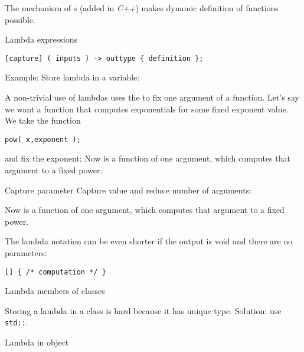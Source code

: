 
The mechanism of s (added in
\emph{C++}) makes
dynamic definition of functions possible.

\begin{block}{Lambda expressions}
  \label{sl:lambda-syntax}
\begin{verbatim}
[capture] ( inputs ) -> outtype { definition };
\end{verbatim}
Example:
Store lambda in a variable:
\end{block}

A non-trivial use of lambdas uses the  to fix one argument of a
function.
Let's say we want a function that computes exponentials for some fixed
exponent value. We take the 
 function
\begin{verbatim}
pow( x,exponent );
\end{verbatim}
and fix the exponent:
%
%
Now  is a function of one argument, which computes
that argument to a fixed power.

\begin{slide}{Capture parameter}
  \label{sl:lambda-capture}
  Capture value and reduce number of arguments:

  Now  is a function of one argument, which computes
  that argument to a fixed power.
\end{slide}

The lambda notation can be even shorter if the output is void and
there are no parameters:
\begin{lstlisting}
[] { /* computation */ }
\end{lstlisting}

 {Lambda members of classes}

Storing a lambda in a class is hard because it has unique
type. Solution: use \lstinline{std::}.

\begin{block}{Lambda in object}
  \label{sl:lambda-class}
\end{block}

